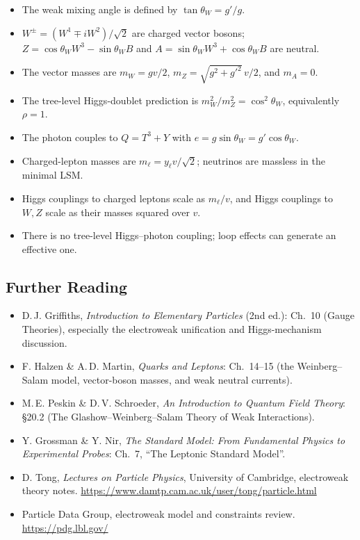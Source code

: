 \begin{itemize}
  \item The weak mixing angle is defined by $\tan\theta_W=g'/g$.
  \item $W^\pm=(W^1\mp iW^2)/\sqrt2$ are charged vector bosons; $Z=\cos\theta_W W^3-\sin\theta_W B$ and $A=\sin\theta_W W^3+\cos\theta_W B$ are neutral.
  \item The vector masses are $m_W=gv/2$, $m_Z=\sqrt{g^2+g'^2}\,v/2$, and $m_A=0$.
  \item The tree-level Higgs-doublet prediction is $m_W^2/m_Z^2=\cos^2\theta_W$, equivalently $\rho=1$.
  \item The photon couples to $Q=T^3+Y$ with $e=g\sin\theta_W=g'\cos\theta_W$.
  \item Charged-lepton masses are $m_\ell=y_\ell v/\sqrt2$; neutrinos are massless in the minimal LSM.
  \item Higgs couplings to charged leptons scale as $m_\ell/v$, and Higgs couplings to $W,Z$ scale as their masses squared over $v$.
  \item There is no tree-level Higgs--photon coupling; loop effects can generate an effective one.
\end{itemize}

\begin{furtherreading}
\subsection*{Further Reading}

\begin{itemize}
  \item D.\,J. Griffiths, \textit{Introduction to Elementary Particles} (2nd ed.): Ch.~10 (Gauge Theories), especially the electroweak unification and Higgs-mechanism discussion.
  \item F. Halzen \& A.\,D. Martin, \textit{Quarks and Leptons}: Ch.~14--15 (the Weinberg--Salam model, vector-boson masses, and weak neutral currents).
  \item M.\,E. Peskin \& D.\,V. Schroeder, \textit{An Introduction to Quantum Field Theory}: \S20.2 (The Glashow--Weinberg--Salam Theory of Weak Interactions).
  \item Y. Grossman \& Y. Nir, \textit{The Standard Model: From Fundamental Physics to Experimental Probes}: Ch.~7, ``The Leptonic Standard Model''.
  \item D. Tong, \textit{Lectures on Particle Physics}, University of Cambridge, electroweak theory notes. \url{https://www.damtp.cam.ac.uk/user/tong/particle.html}
  \item Particle Data Group, electroweak model and constraints review. \url{https://pdg.lbl.gov/}
\end{itemize}
\end{furtherreading}
